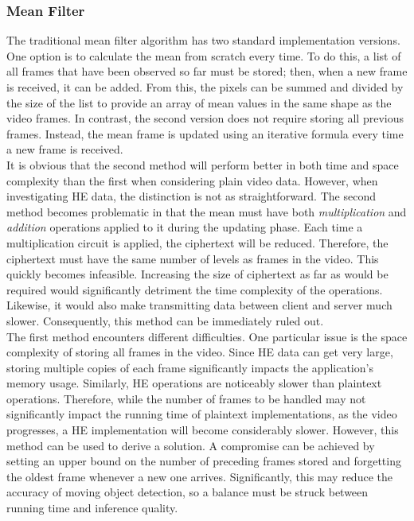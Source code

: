 \setlength{\leftskip}{0cm}
\subsubsection{Mean Filter}
\setlength{\leftskip}{0.5cm}
\indent \indent
The traditional mean filter algorithm has two standard implementation versions. One option is to calculate the mean from scratch every time. To do this, a list of all frames that have been observed so far must be stored; then, when a new frame is received, it can be added. From this, the pixels can be summed and divided by the size of the list to provide an array of mean values in the same shape as the video frames. In contrast, the second version does not require storing all previous frames. Instead, the mean frame is updated using an iterative formula every time a new frame is received.\smallskip \\ \indent
It is obvious that the second method will perform better in both time and space complexity than the first when considering plain video data. However, when investigating HE data, the distinction is not as straightforward. The second method becomes problematic in that the mean must have both \textit{multiplication} and \textit{addition} operations applied to it during the updating phase. Each time a multiplication circuit is applied, the ciphertext will be reduced. Therefore, the ciphertext must have the same number of levels as frames in the video. This quickly becomes infeasible. Increasing the size of ciphertext as far as would be required would significantly detriment the time complexity of the operations. Likewise, it would also make transmitting data between client and server much slower. Consequently, this method can be immediately ruled out.
\smallskip \\ \indent
The first method encounters different difficulties. One particular issue is the space complexity of storing all frames in the video. Since HE data can get very large, storing multiple copies of each frame significantly impacts the application's memory usage. Similarly, HE operations are noticeably slower than plaintext operations. Therefore, while the number of frames to be handled may not significantly impact the running time of plaintext implementations, as the video progresses, a HE implementation will become considerably slower. However, this method can be used to derive a solution. A compromise can be achieved by setting an upper bound on the number of preceding frames stored and forgetting the oldest frame whenever a new one arrives. Significantly, this may reduce the accuracy of moving object detection, so a balance must be struck between running time and inference quality.

